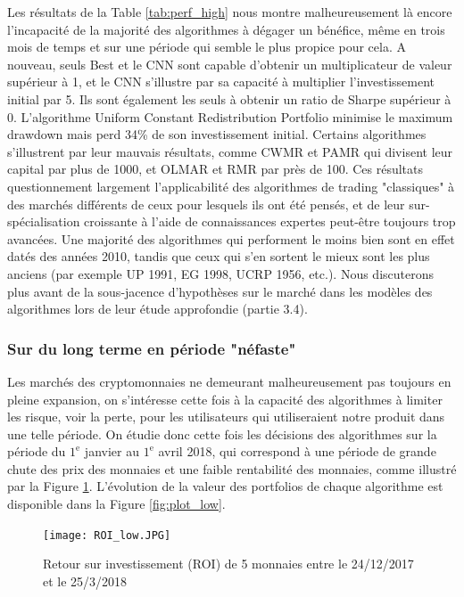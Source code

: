 \documentclass[a4paper, 10pt]{article}
\begin{document}
Les résultats de la Table \ref{tab:perf_high} nous montre malheureusement là encore l'incapacité de la majorité des algorithmes à dégager un bénéfice, même en trois mois de temps et sur une période qui semble le plus propice pour cela. A nouveau, seuls Best et le CNN sont capable d'obtenir un multiplicateur de valeur supérieur à 1, et le CNN s'illustre par sa capacité à multiplier l'investissement initial par 5. Ils sont également les seuls à obtenir un ratio de Sharpe supérieur à 0. L'algorithme Uniform Constant Redistribution Portfolio minimise le maximum drawdown mais perd 34\% de son investissement initial. Certains algorithmes s'illustrent par leur mauvais résultats, comme CWMR et PAMR qui divisent leur capital par plus de 1000, et OLMAR et RMR par près de 100. Ces résultats questionnement largement l'applicabilité des algorithmes de trading "classiques" à des marchés différents de ceux pour lesquels ils ont été pensés, et de leur sur-spécialisation croissante à l'aide de connaissances expertes peut-être toujours trop avancées. Une majorité des algorithmes qui performent le moins bien sont en effet datés des années 2010, tandis que ceux qui s'en sortent le mieux sont les plus anciens (par exemple UP 1991, EG 1998, UCRP 1956, etc.). Nous discuterons plus avant de la sous-jacence d'hypothèses sur le marché dans les modèles des algorithmes lors de leur étude approfondie (partie 3.4).

\subsubsection{Sur du long terme en période "néfaste"}

Les marchés des cryptomonnaies ne demeurant malheureusement pas toujours en pleine expansion, on s'intéresse cette fois à la capacité des algorithmes à limiter les risque, voir la perte, pour les utilisateurs qui utiliseraient notre produit dans une telle période. On étudie donc cette fois les décisions des algorithmes sur la période du $1^{\text{e}}$ janvier au $1^{\text{e}}$ avril 2018, qui correspond à une période de grande chute des prix des monnaies et une faible rentabilité des monnaies, comme illustré par la Figure \ref{fig:roi_low}. L'évolution de la valeur des portfolios de chaque algorithme est disponible dans la Figure \ref{fig:plot_low}.

\begin{figure}[ht!]
\begin{center}
\texttt{[image: ROI\_low.JPG]}
\caption{Retour sur investissement (ROI) de 5 monnaies entre le 24/12/2017 et le 25/3/2018}
\label{fig:roi_low}
\end{center}
\end{figure}
\end{document}
